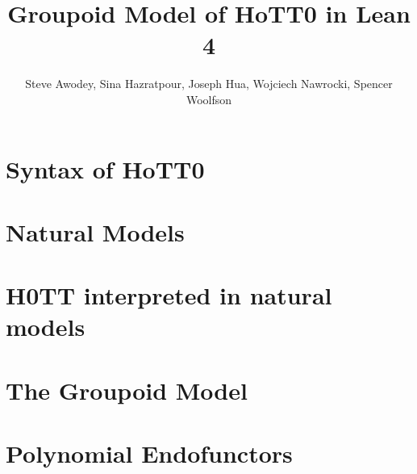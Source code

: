 
\title{Groupoid Model of HoTT0 in Lean 4}
\author{Steve Awodey, Sina Hazratpour, Joseph Hua,
  Wojciech Nawrocki, Spencer Woolfson}


\maketitle

\chapter{Syntax of HoTT0}

\chapter{Natural Models}

\chapter{H0TT interpreted in natural models}

\chapter{The Groupoid Model}

\chapter{Polynomial Endofunctors}


{}



